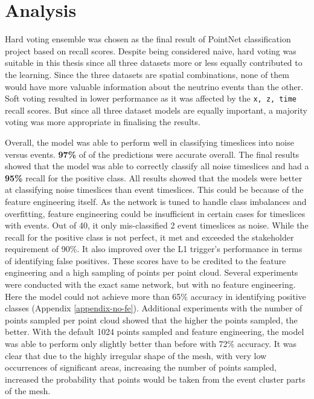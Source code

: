 \section{Analysis}
Hard voting ensemble was chosen as the final result of PointNet classification project based on recall scores. Despite being considered naive, hard voting was suitable in this thesis since all three datasets more or less equally contributed to the learning. Since the three datasets are spatial combinations, none of them would have more valuable information about the neutrino events than the other. Soft voting resulted in lower performance as it was affected by the \texttt{x, z, time} recall scores. But since all three dataset models are equally important, a majority voting was more appropriate in finalising the results. 

Overall, the model was able to perform well in classifying timeslices into noise versus events. \textbf{97\%} of of the predictions were accurate overall. The final results showed that the model was able to correctly classify all noise timeslices and had a \textbf{95\%} recall for the positive class. All results showed that the models were better at classifying noise timeslices than event timeslices. This could be because of the feature engineering itself. As the network is tuned to handle class imbalances and overfitting, feature engineering could be insufficient in certain cases for timeslices with events. Out of 40, it only mis-classified 2 event timeslices as noise. While the recall for the positive class is not perfect, it met and exceeded the stakeholder requirement of 90\%. It also improved over the L1 trigger's performance in terms of identifying false positives. These scores have to be credited to the feature engineering and a high sampling of points per point cloud. Several experiments were conducted with the exact same network, but with no feature engineering. Here the model could not achieve more than 65\% accuracy in identifying positive classes (Appendix \ref{appendix-no-fe}). Additional experiments with the number of points sampled per point cloud showed that the higher the points sampled, the better. With the default 1024 points sampled and feature engineering, the model was able to perform only slightly better than before with 72\% accuracy. It was clear that due to the highly irregular shape of the mesh, with very low occurrences of significant areas, increasing the number of points sampled, increased the probability that points would be taken from the event cluster parts of the mesh. 

